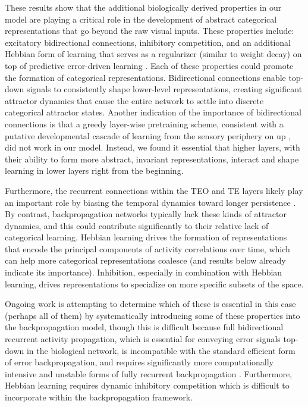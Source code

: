 \documentclass[11pt,twoside]{article}
\newif\myifpdf
\begin{document}
These results show that the additional biologically derived properties in our model are playing a critical role in the development of abstract categorical representations that go beyond the raw visual inputs. These properties include: excitatory bidirectional connections, inhibitory competition, and an additional Hebbian form of learning that serves as a regularizer (similar to weight decay) on top of predictive error-driven learning \citep{OReilly98,OReillyMunakata00}.  Each of these properties could promote the formation of categorical representations. Bidirectional connections enable top-down signals to consistently shape lower-level representations, creating significant attractor dynamics that cause the entire network to settle into discrete categorical attractor states.  Another indication of the importance of bidirectional connections is that a greedy layer-wise pretraining scheme, consistent with a putative developmental cascade of learning from the sensory periphery on up \citep{ShragerJohnson96,BengioYaoAlainEtAl13,Valpola14,HintonSalakhutdinov06}, did not work in our model. Instead, we found it essential that higher layers, with their ability to form more abstract, invariant representations, interact and shape learning in lower layers right from the beginning.

Furthermore, the recurrent connections within the TEO and TE layers likely play an important role by biasing the temporal dynamics toward longer persistence \citep{ChaudhuriKnoblauchGarielEtAl15}.  By contrast, backpropagation networks typically lack these kinds of attractor dynamics, and this could contribute significantly to their relative lack of categorical learning.  Hebbian learning drives the formation of representations that encode the principal components of activity correlations over time, which can help more categorical representations coalesce (and results below already indicate its importance).  Inhibition, especially in combination with Hebbian learning, drives representations to specialize on more specific subsets of the space.

Ongoing work is attempting to determine which of these is essential in this case (perhaps all of them) by systematically introducing some of these properties into the backpropagation model, though this is difficult because full bidirectional recurrent activity propagation, which is essential for conveying error signals top-down in the biological network, is incompatible with the standard efficient form of error backpropagation, and requires significantly more computationally intensive and unstable forms of fully recurrent backpropagation \citep{WilliamsZipser92,Pineda87}.  Furthermore, Hebbian learning requires dynamic inhibitory competition which is difficult to incorporate within the backpropagation framework.
\end{document}
